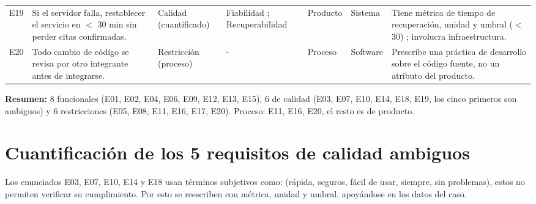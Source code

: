 \documentclass[conference,onecolumn]{IEEEtran}
\begin{document}
{\begin{longtable}{@{}L{0.04\textwidth}L{0.18\textwidth}L{0.11\textwidth}L{0.15\textwidth}L{0.08\textwidth}L{0.08\textwidth}L{0.27\textwidth}@{}}
E19 & Si el servidor falla, restablecer el servicio en $<$ 30 min sin perder citas confirmadas. & Calidad (cuantificado) & Fiabilidad ; Recuperabilidad & Producto & Sistema & Tiene métrica de tiempo de recuperación, unidad y umbral ($<$ 30) ; involucra infraestructura.\\
E20 & Todo cambio de código se revisa por otro integrante antes de integrarse. & Restricción (proceso) & - & Proceso & Software & Prescribe una práctica de desarrollo sobre el código fuente, no un atributo del producto.\\
\end{longtable}
}

\textbf{Resumen:} 8 funcionales (E01, E02, E04, E06, E09, E12, E13, E15), 6 de calidad (E03, E07, E10, E14, E18, E19, los cinco primeros son ambiguos) y 6 restricciones (E05, E08, E11, E16, E17, E20). Proceso: E11, E16, E20, el resto es de producto.

\section{Cuantificación de los 5 requisitos de calidad ambiguos}
Los enunciados E03, E07, E10, E14 y E18 usan términos subjetivos como: (rápida, seguros, fácil de usar, siempre, sin problemas), estos no permiten verificar su cumplimiento. Por esto se reescriben con métrica, unidad y umbral, apoyándose en los datos del caso.
\end{document}
